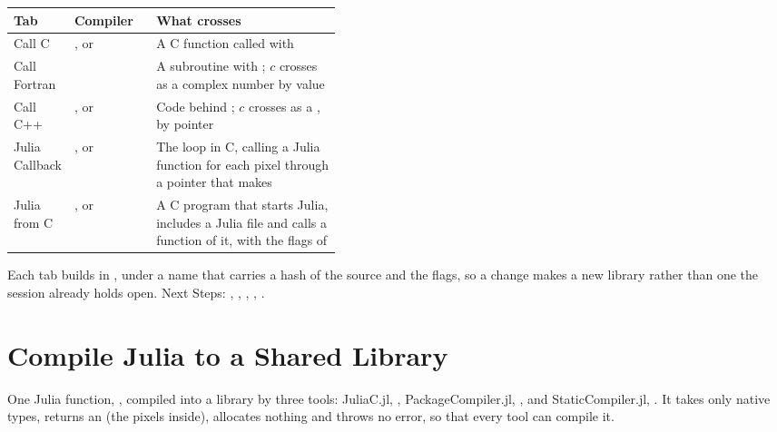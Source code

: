 \begin{center}\small
\renewcommand{\arraystretch}{1.25}
\begin{tabularx}{\linewidth}{@{}p{0.17\linewidth}p{0.25\linewidth}L@{}}
\toprule
\textbf{Tab} & \textbf{Compiler} & \textbf{What crosses}\\
\midrule
Call C & ,  or  & A C function called with \\
Call Fortran &  & A subroutine with ; $c$ crosses as a complex number by value\\
Call C++ & ,  or  & Code behind ; $c$ crosses as a
  , by pointer\\
Julia Callback & ,  or  & The loop in C, calling a Julia function for each pixel through
  a pointer that  makes\\
Julia from C & ,  or  & A C program that starts Julia, includes a Julia file and calls
  a function of it, with the flags of \\
\bottomrule
\end{tabularx}
\end{center}
Each tab builds in , under a name that carries a hash of the source and the flags, so a
change makes a new library rather than one the session already holds open. Next Steps: ,
, , , .

\section{Compile Julia to a Shared Library}\label{sec:shared}
One Julia function, , compiled into a library by three tools: JuliaC.jl,
, PackageCompiler.jl, , and StaticCompiler.jl, . It takes only native types, returns
an  (the pixels inside), allocates nothing and throws no error, so that every tool can compile it.

